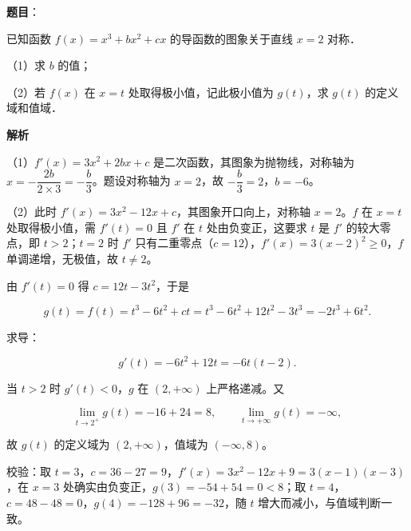 \begin{answer}

\textbf{题目}：

已知函数 $f(x)=x^3+bx^2+cx$ 的导函数的图象关于直线 $x=2$ 对称．

（1）求 $b$ 的值；

（2）若 $f(x)$ 在 $x=t$ 处取得极小值，记此极小值为 $g(t)$，求 $g(t)$ 的定义域和值域．

\textbf{解析}

（1）$f'(x)=3x^2+2bx+c$ 是二次函数，其图象为抛物线，对称轴为 $x=-\dfrac{2b}{2\times3}=-\dfrac b3$。题设对称轴为 $x=2$，故 $-\dfrac b3=2$，$b=-6$。

（2）此时 $f'(x)=3x^2-12x+c$，其图象开口向上，对称轴 $x=2$。$f$ 在 $x=t$ 处取得极小值，需 $f'(t)=0$ 且 $f'$ 在 $t$ 处由负变正，这要求 $t$ 是 $f'$ 的较大零点，即 $t>2$；$t=2$ 时 $f'$ 只有二重零点（$c=12$），$f'(x)=3(x-2)^2\geqslant0$，$f$ 单调递增，无极值，故 $t\ne2$。

由 $f'(t)=0$ 得 $c=12t-3t^2$，于是

\nopagebreak[4]
\[g(t)=f(t)=t^3-6t^2+ct=t^3-6t^2+12t^2-3t^3=-2t^3+6t^2.\]

求导：

\nopagebreak[4]
\[g'(t)=-6t^2+12t=-6t(t-2).\]

当 $t>2$ 时 $g'(t)<0$，$g$ 在 $(2,+\infty)$ 上严格递减。又

\nopagebreak[4]
\[\lim_{t\to2^+}g(t)=-16+24=8,\qquad \lim_{t\to+\infty}g(t)=-\infty,\]

故 $g(t)$ 的定义域为 $(2,+\infty)$，值域为 $(-\infty,8)$。

校验：取 $t=3$，$c=36-27=9$，$f'(x)=3x^2-12x+9=3(x-1)(x-3)$，在 $x=3$ 处确实由负变正，$g(3)=-54+54=0<8$；取 $t=4$，$c=48-48=0$，$g(4)=-128+96=-32$，随 $t$ 增大而减小，与值域判断一致。


\end{answer}
